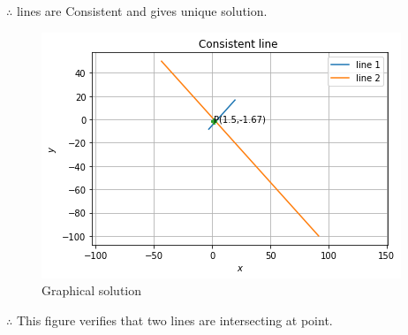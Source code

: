 \documentclass[journal,12pt,twocolumn]{IEEEtran}
\begin{document}
   $\therefore$ lines are Consistent and gives unique solution.
\begin{figure}[H]
    \includegraphics[width= \columnwidth]{consistent line.png}
    \caption{Graphical solution}
    \label{Fig:Graphical Solution}
\end{figure}
   $\therefore$ This figure verifies that two lines are intersecting at point.
\end{document}
